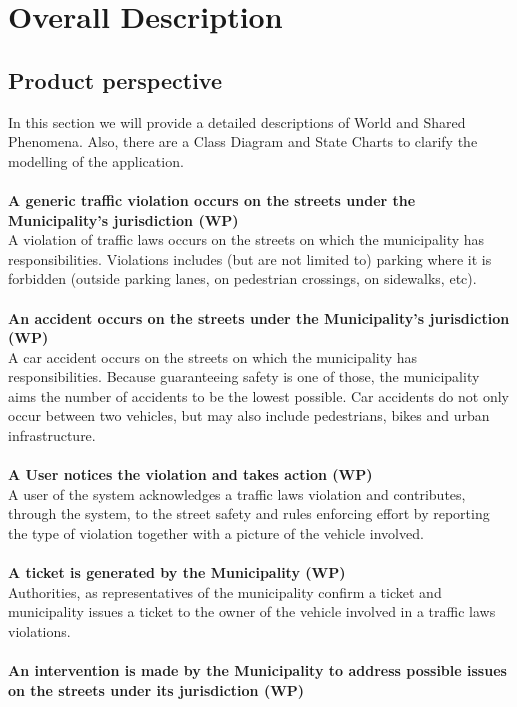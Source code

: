 \documentclass {article}
\begin{document}
\pagebreak	
	
\section{Overall Description}
	\subsection{Product perspective} 
	In this section we will provide a detailed descriptions of World and Shared Phenomena. Also, there are a Class Diagram and State Charts to clarify the modelling of the application. \\ \\
	{\bf A generic traffic violation occurs on the streets under the \mbox{Municipality's} jurisdiction (WP)} \\
		A violation of traffic laws occurs on the streets on which the municipality has responsibilities.
Violations includes (but are not limited to) parking where it is forbidden (outside parking lanes, on pedestrian crossings, on sidewalks, etc). \\ \\
	{\bf An accident occurs on the streets under the Municipality's jurisdiction (WP)} \\
		A car accident occurs on the streets on which the municipality has responsibilities. Because guaranteeing safety is one of those, the municipality aims the number of accidents to be the lowest possible. Car accidents do not only occur between two vehicles, but may also include pedestrians, bikes and urban infrastructure. \\ \\
	{\bf A User notices the violation and takes action (WP)} \\
		A user of the system acknowledges a traffic laws violation and contributes, through the system, to the street safety and rules enforcing effort by reporting the type of violation together with a picture of the vehicle involved. \\ \\
	{\bf A ticket is generated by the Municipality (WP)}\\
		Authorities, as representatives of the municipality confirm a ticket and municipality issues a ticket to the owner of the vehicle involved in a traffic laws violations. \\ \\
	{\bf An intervention is made by the Municipality to address possible issues on the streets under its jurisdiction (WP)} \\
\end{document}
